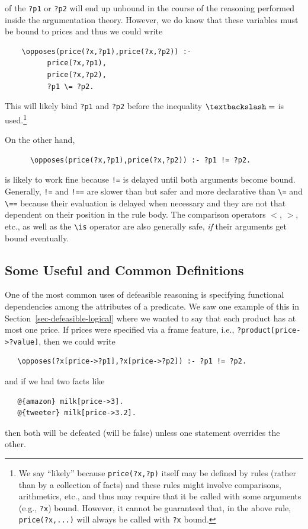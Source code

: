 \documentclass[11pt]{article}
\newcommand{\bs}{\textbackslash}
\begin{document}
\begin{itemize}
  of the \texttt{?p1} or \texttt{?p2} will end up unbound in the course of
  the reasoning performed inside the argumentation theory.  
  However, we do know that these variables must be bound to
  prices and thus we could write
\begin{verbatim}
    \opposes(price(?x,?p1),price(?x,?p2)) :-
          price(?x,?p1),
          price(?x,?p2),
          ?p1 \= ?p2.
\end{verbatim}
  This will likely bind \texttt{?p1} and \texttt{?p2} before the
  inequality $\bs=$ is used.\footnote{
    We say ``likely'' because \texttt{price(?x,?p)} itself may be defined
    by rules (rather than by a collection of facts)
    and these rules might involve comparisons, arithmetics, etc., and thus
    may require that it be called with some arguments (e.g., \texttt{?x})
    bound. However, it cannot be guaranteed that, in the above rule,
    \texttt{price(?x,...)}  will always be called with \texttt{?x} bound. 
  }

  On the other hand,
\begin{verbatim}
      \opposes(price(?x,?p1),price(?x,?p2)) :- ?p1 != ?p2.
\end{verbatim}
  is likely to work fine because \texttt{!=} is delayed until both
  arguments become bound. Generally, \texttt{!=} and \texttt{!==} are
  slower than but safer and more declarative
  than \texttt{\bs{}=} and  \texttt{\bs{}==} because their evaluation is
  delayed when necessary and they are not that dependent on their position
  in the rule body. The comparison operators $<$, $>$, etc., as well as the
  \texttt{\bs{}is} operator are also generally safe, \emph{if} their
  arguments get bound eventually.  
\end{itemize}

\subsection{Some Useful and Common Definitions}

One of the most common uses of defeasible reasoning is specifying functional
dependencies among the attributes of a predicate. We saw one example of
this in Section~\ref{sec-defeasible-logical} where we wanted to say that
each product has at most one price.
If prices were specified via a frame feature, i.e.,
\texttt{?product[price->?value]}, then we could write
\begin{verbatim}
   \opposes(?x[price->?p1],?x[price->?p2]) :- ?p1 != ?p2.
\end{verbatim}
and if we had two facts like
\begin{verbatim}
   @{amazon} milk[price->3]. 
   @{tweeter} milk[price->3.2].
\end{verbatim}
then both will be defeated (will be false)
unless one statement overrides the other.
\end{document}
